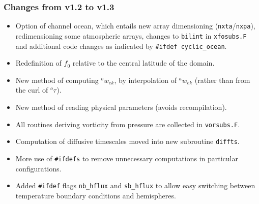 \documentclass[11pt, a4paper,twoside]{article}
\newcommand{\ek}[1]{{{}^{#1}w_{ek}}}
\newcommand{\tx}[2]{{}^{#1}\tau^{#2}}
\numberwithin{equation}{section}
\begin{document}
\subsubsection{Changes from v1.2 to v1.3}
\begin{itemize}
  \item Option of channel ocean, which entails new array dimensioning (\verb=nxta=/\verb=nxpa=), redimensioning some atmospheric arrays, changes to \verb=bilint= in \verb=xfosubs.F= and additional code changes as indicated by \verb=#ifdef cyclic_ocean=.
  \item Redefinition of $f_0$ relative to the central latitude of the domain.
  \item New method of computing $\ek{o}$, by interpolation of $\ek{a}$ (rather than from the curl of $\tx{o}{}$).
  \item New method of reading physical parameters (avoids recompilation).
  \item All routines deriving vorticity from pressure are collected in \verb=vorsubs.F=.
  \item Computation of diffusive timescales moved into new subroutine \verb=diffts=.
  \item More use of \verb=#ifdefs= to remove unnecessary computations in particular configurations.
  \item Added \verb=#ifdef= flags \verb=nb_hflux= and   \verb=sb_hflux= to allow easy switching between temperature boundary conditions and hemispheres.
\end{itemize}
\end{document}
